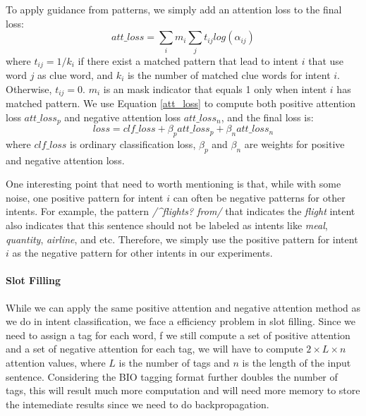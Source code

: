 To apply guidance from \RE patterns, we simply add an attention loss to the final loss:
\begin{equation}
att\_loss = \sum_{i}{m_i\sum_{j}{t_{ij}log(\alpha_{ij})}}
\label{att_loss}
\end{equation}
where $t_{ij} = 1/k_{i}$ if there exist a matched pattern that lead to intent $i$ that use word $j$ as clue word, and $k_i$ is the number of matched clue words for intent $i$. Otherwise, $t_{ij} = 0$. $m_i$ is an mask indicator that equals 1 only when intent $i$ has matched \RE pattern. We use Equation \ref{att_loss} to compute both positive attention loss $att\_loss_p$ and negative attention loss $att\_loss_n$, and the final loss is:
\begin{equation}
loss = clf\_loss + \beta_p att\_loss_p + \beta_n att\_loss_n
\end{equation} 
where $clf\_loss$ is ordinary classification loss, $\beta_p$ and $\beta_n$ are weights for positive and negative attention loss.

One interesting point that need to worth mentioning is that, while with some noise, one positive pattern for intent $i$ can often be negative patterns for other intents. For example, the pattern \textsl{/\textasciicircum flights? from/} that indicates the \emph{flight} intent also indicates that this sentence should not be labeled as intents like \emph{meal}, \emph{quantity}, \emph{airline}, and etc.
Therefore, we simply use the positive pattern for intent $i$ as the negative pattern for other intents in our experiments.

\paragraph{Slot Filling}
While we can apply the same positive attention and negative attention method as we do in intent classification, we face a efficiency problem in slot filling. Since we need to assign a tag for each word, f we still compute a set of positive attention and a set of negative attention for each tag, we will have to compute $2\times L \times n$ attention values, where $L$ is the number of tags and $n$ is the length of the input sentence. Considering the BIO tagging format further doubles the number of tags, this will result much more computation and will need more memory to store the intemediate results since we need to do backpropagation. 

